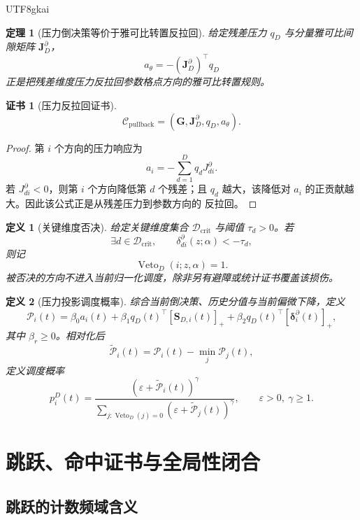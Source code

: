 \documentclass[12pt]{article}
\newtheorem{definition}{定义}[section]
\newtheorem{theorem}{定理}[section]
\newtheorem{Certificate}{证书}[section]
\DeclareMathOperator{\Veto}{Veto}
\begin{document}
\begin{CJK*}{UTF8}{gkai}
\begin{theorem}[压力倒决策等价于雅可比转置反拉回]
\label{thm:lhts-pullback}
给定残差压力 \(q_D\) 与分量雅可比间隙矩阵 \(\mathbf J_D^\partial\)，
\[
  a_\theta=-(\mathbf J_D^\partial)^\top q_D
\]
正是把残差维度压力反拉回参数格点方向的雅可比转置规则。
\end{theorem}

\begin{Certificate}[压力反拉回证书]
\[
  \mathcal C_{\mathrm{pullback}}
  =
  (\mathbf G,\mathbf J_D^\partial,q_D,a_\theta).
\]
\end{Certificate}

\begin{proof}
第 \(i\) 个方向的压力响应为
\[
  a_i=-\sum_{d=1}^{D}q_dJ_{di}^{\partial}.
\]
若 \(J_{di}^{\partial}<0\)，则第 \(i\) 个方向降低第 \(d\) 个残差；且 \(q_d\)
越大，该降低对 \(a_i\) 的正贡献越大。因此该公式正是从残差压力到参数方向的
反拉回。
\end{proof}

\begin{definition}[关键维度否决]
给定关键维度集合 \(\mathcal D_{\mathrm{crit}}\) 与阈值 \(\tau_d>0\)。若
\[
  \exists d\in\mathcal D_{\mathrm{crit}},
  \qquad
  \delta_{di}^{\partial}(z;\alpha)<-\tau_d,
\]
则记
\[
  \Veto_D(i;z,\alpha)=1.
\]
被否决的方向不进入当前归一化调度，除非另有避障或统计证书覆盖该损伤。
\end{definition}

\begin{definition}[压力投影调度概率]
综合当前倒决策、历史分值与当前偏微下降，定义
\[
  \mathscr P_i(t)
  =
  \beta_0 a_i(t)
  +
  \beta_1 q_D(t)^\top[\mathbf S_{D,i}(t)]_+
  +
  \beta_2 q_D(t)^\top[\boldsymbol\delta_i^\partial(t)]_+ ,
\]
其中 \(\beta_r\ge0\)。相对化后
\[
  \widetilde{\mathscr P}_i(t)
  =
  \mathscr P_i(t)-\min_j\mathscr P_j(t),
\]
定义调度概率
\[
  p_i^D(t)
  =
  \frac{(\varepsilon+\widetilde{\mathscr P}_i(t))^\gamma}
  {\sum_{j:\Veto_D(j)=0}
  (\varepsilon+\widetilde{\mathscr P}_j(t))^\gamma},
  \qquad
  \varepsilon>0,\ \gamma\ge1 .
\]
\end{definition}

\section{跳跃、命中证书与全局性闭合}
\label{sec:lhts-jump-global}

\subsection{跳跃的计数频域含义}
\label{subsec:lhts-count-frequency}


\end{CJK*}
\end{document}
